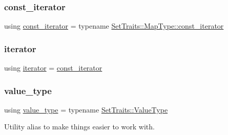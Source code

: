 \subsubsection{\texorpdfstring{const\+\_\+iterator}{const\_iterator}}
{\footnotesize\ttfamily using \mbox{\hyperlink{classstanfordcpplib_1_1collections_1_1GenericSet_a49eb513fe04e245250a4aebfb1ac768a}{const\+\_\+iterator}} =  typename \mbox{\hyperlink{classMap_a04e3b848cce2bbfed5ea818e1b264000}{Set\+Traits\+::\+Map\+Type\+::const\+\_\+iterator}}}

\mbox{\label{classstanfordcpplib_1_1collections_1_1GenericSet_ab3d10e70baaeac78e76b7abae7e2cf76}} 
\subsubsection{\texorpdfstring{iterator}{iterator}}
{\footnotesize\ttfamily using \mbox{\hyperlink{classstanfordcpplib_1_1collections_1_1GenericSet_ab3d10e70baaeac78e76b7abae7e2cf76}{iterator}} =  \mbox{\hyperlink{classstanfordcpplib_1_1collections_1_1GenericSet_a49eb513fe04e245250a4aebfb1ac768a}{const\+\_\+iterator}}}

\mbox{\label{classstanfordcpplib_1_1collections_1_1GenericSet_a669c81f158766925e7293f97c0099b28}} 
\subsubsection{\texorpdfstring{value\+\_\+type}{value\_type}}
{\footnotesize\ttfamily using \mbox{\hyperlink{classstanfordcpplib_1_1collections_1_1GenericSet_a669c81f158766925e7293f97c0099b28}{value\+\_\+type}} =  typename \mbox{\hyperlink{structstanfordcpplib_1_1collections_1_1SetTraits_aecaeabaa9da616ae42bb20787878260d}{Set\+Traits\+::\+Value\+Type}}}



Utility alias to make things easier to work with. 



